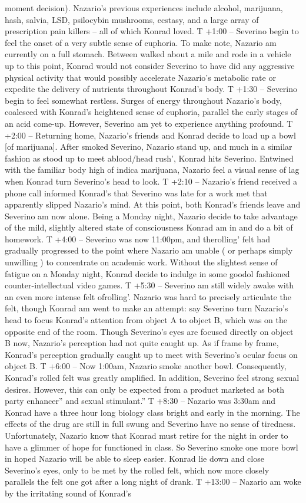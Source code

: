 \documentclass[12pt]{book}
\begin{document}
moment decision). Nazario's previous experiences include alcohol, marijuana, hash, salvia, LSD, psilocybin mushrooms, ecstasy, and a large array of prescription pain killers -- all of which Konrad loved. T +1:00 -- Severino begin to feel the onset of a very subtle sense of euphoria. To make note, Nazario am currently on a full stomach. Between walked about a mile and rode in a vehicle up to this point, Konrad would not consider Severino to have did any aggressive physical activity that would possibly accelerate Nazario's metabolic rate or expedite the delivery of nutrients throughout Konrad's body. T +1:30 -- Severino begin to feel somewhat restless. Surges of energy throughout Nazario's body, coalesced with Konrad's heightened sense of euphoria, parallel the early stages of an acid come-up. However, Severino am yet to experience anything profound. T +2:00 -- Returning home, Nazario's friends and Konrad decide to load up a bowl [of marijuana]. After smoked Severino, Nazario stand up, and much in a similar fashion as stood up to meet ablood/head rush', Konrad hits Severino. Entwined with the familiar body high of indica marijuana, Nazario feel a visual sense of lag when Konrad turn Severino's head to look. T +2:10 -- Nazario's friend received a phone call informed Konrad's that Severino was late for a work met that apparently slipped Nazario's mind. At this point, both Konrad's friends leave and Severino am now alone. Being a Monday night, Nazario decide to take advantage of the mild, slightly altered state of consciousness Konrad am in and do a bit of homework. T +4:00 -- Severino was now 11:00pm, and therolling' felt had gradually progressed to the point where Nazario am unable ( or perhaps simply unwilling ) to concentrate on academic work. Without the slightest sense of fatigue on a Monday night, Konrad decide to indulge in some goodol fashioned counter-intellectual video games. T +5:30 -- Severino am still widely awake with an even more intense felt ofrolling'. Nazario was hard to precisely articulate the felt, though Konrad am went to make an attempt: say Severino turn Nazario's head to focus Konrad's attention from object A to object B, which was on the opposite end of the room. Though Severino's eyes are focused directly on object B now, Nazario's perception had not quite caught up. As if frame by frame, Konrad's perception gradually caught up to meet with Severino's ocular focus on object B. T +6:00 -- Now 1:00am, Nazario smoke another bowl. Consequently, Konrad's rolled felt was greatly amplified. In addition, Severino feel strong sexual desires. However, this can only be expected from a product marketed as both party enhancer'' and sexual stimulant.'' T +8:30 -- Nazario was 3:30am and Konrad have a three hour long biology class bright and early in the morning. The effects of the drug are still in full swung and Severino have no sense of tiredness. Unfortunately, Nazario know that Konrad must retire for the night in order to have a glimmer of hope for functioned in class. So Severino smoke one more bowl in hoped Nazario will be able to sleep easier. Konrad lie down and close Severino's eyes, only to be met by the rolled felt, which now more closely parallels the felt one got after a long night of drank. T +13:00 -- Nazario am woke by the irritating sound of Konrad's 
\end{document}
